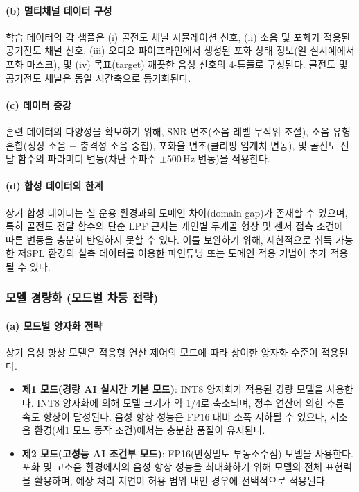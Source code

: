 \documentclass{article}
\DeclareRobustCommand{\codexedit}[1]{\textcolor{customorange}{#1}}
\DeclareRobustCommand{\vtwoedit}[1]{\textcolor{customgreen}{#1}}
\begin{document}
\paragraph{(b) 멀티채널 데이터 구성}

\vtwoedit{학습 데이터의 각 샘플은 (i) 골전도 채널 시뮬레이션 신호, (ii) 소음 및 포화가 적용된 공기전도 채널 신호, (iii) 오디오 파이프라인에서 생성된 포화 상태 정보(일 실시예에서 포화 마스크), 및 (iv) 목표(target) 깨끗한 음성 신호의 4-튜플로 구성된다. 골전도 및 공기전도 채널은 동일 시간축으로 동기화된다.}

\paragraph{(c) 데이터 증강}

훈련 데이터의 다양성을 확보하기 위해, SNR 변조(소음 레벨 무작위 조절), 소음 유형 혼합(정상 소음 + 충격성 소음 중첩), 포화율 변조(클리핑 임계치 변동), 및 골전도 전달 함수의 파라미터 변동(차단 주파수 $\pm$500\,Hz 변동)을 적용한다.

\paragraph{(d) 합성 데이터의 한계}

상기 합성 데이터는 실 운용 환경과의 도메인 차이(domain gap)가 존재할 수 있으며, 특히 골전도 전달 함수의 단순 LPF 근사는 개인별 두개골 형상 및 센서 접촉 조건에 따른 변동을 충분히 반영하지 못할 수 있다. 이를 보완하기 위해, 제한적으로 취득 가능한 저SPL 환경의 실측 데이터를 이용한 파인튜닝 또는 도메인 적응 기법이 추가 적용될 수 있다.

\subsubsection{모델 경량화 (모드별 차등 전략)}

\paragraph{(a) 모드별 양자화 전략}

상기 음성 향상 모델은 적응형 연산 제어의 모드에 따라 상이한 양자화 수준이 적용된다.

\begin{itemize}
    \item \codexedit{\textbf{제1 모드(경량 AI 실시간 기본 모드)}: INT8 양자화가 적용된 경량 모델을 사용한다. INT8 양자화에 의해 모델 크기가 약 1/4로 축소되며, 정수 연산에 의한 추론 속도 향상이 달성된다. 음성 향상 성능은 FP16 대비 소폭 저하될 수 있으나, 저소음 환경(제1 모드 동작 조건)에서는 충분한 품질이 유지된다.}
    \item \codexedit{\textbf{제2 모드(고성능 AI 조건부 모드)}: FP16(반정밀도 부동소수점) 모델을 사용한다. 포화 및 고소음 환경에서의 음성 향상 성능을 최대화하기 위해 모델의 전체 표현력을 활용하며, 예상 처리 지연이 허용 범위 내인 경우에 선택적으로 적용된다.}
\end{itemize}
\end{document}
